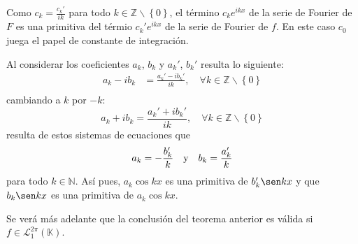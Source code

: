\documentclass[12pt]{report}
\newcounter{it}
\theoremstyle{largebreak}
\begin{document}
    \begin{obs}
        Como $c_k=\frac{c_k'}{ik}$ para todo $k\in\mathbb{Z}\backslash\left\{0 \right\}$, el término $c_ke^{ ikx}$ de la serie de Fourier de $F$ es una primitiva del térmio $c_k'e^{ ikx}$ de la serie de Fourier de $f$. En este caso $c_0$ juega el papel de constante de integración.
        
        Al considerar los coeficientes $a_k$, $b_k$ y $a_k'$, $b_k'$ resulta lo siguiente:
        \begin{equation*}
            \begin{split}
                a_k-ib_k&=\frac{a_k'-ib_k'}{ik},\quad\forall k\in\mathbb{Z}\backslash\left\{0 \right\} \\
            \end{split}
        \end{equation*}
        cambiando a $k$ por $-k$:
        \begin{equation*}
            a_k+ib_k=\frac{a_k'+ib_k'}{ik},\quad\forall k\in\mathbb{Z}\backslash\left\{0 \right\}
        \end{equation*}
        resulta de estos sistemas de ecuaciones que
        \begin{equation*}
            a_k=-\frac{b_k'}{k}\quad\textup{y}\quad b_k=\frac{a_k'}{k}
        \end{equation*}
        para todo $k\in\mathbb{N}$. Así pues, $a_k\cos kx$ es una primitiva de $b_k'\sen kx$ y que $b_k\sen kx$ es una primitiva de $a_k\cos kx$.
    \end{obs}

    Se verá más adelante que la conclusión del teorema anterior es válida si $f\in\mathcal{L}_1^{2\pi}(\mathbb{K})$.
\end{document}
